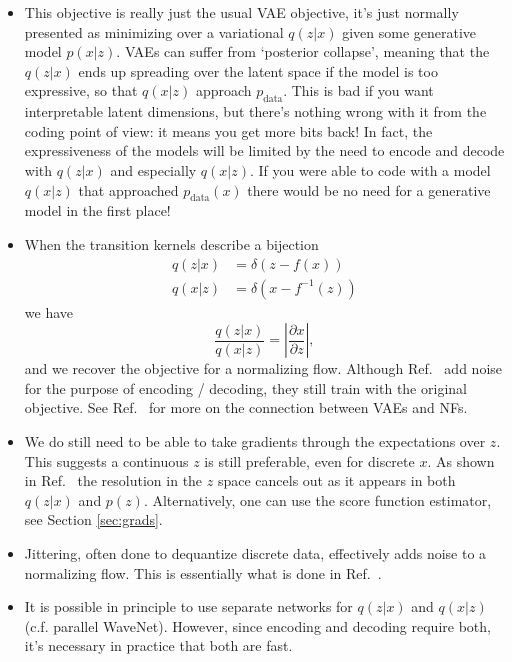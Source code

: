 \documentclass[preprint,notitlepage]{revtex4-1}
\begin{document}
\begin{itemize}

\item This objective is really just the usual VAE objective, it's just normally presented as minimizing over a variational $q(z|x)$ given some generative model $p(x|z)$. VAEs can suffer from `posterior collapse', meaning that the $q(z|x)$ ends up spreading over the latent space if the model is too expressive, so that $q(x|z)$ approach $p_\text{data}$. This is bad if you want interpretable latent dimensions, but there's nothing wrong with it from the coding point of view: it means you get more bits back! In fact, the expressiveness of the models will be limited by the need to encode and decode with $q(z|x)$ and especially $q(x|z)$. If you were able to code with a model $q(x|z)$ that approached $p_\text{data}(x)$ there would be no need for a generative model in the first place!

\item When the transition kernels describe a bijection
%
\begin{align}
  q(z|x) &= \delta(z-f(x))\\
  q(x|z) &= \delta(x-f^{-1}(z))
\end{align}
%
we have
%
\begin{equation}
  \frac{q(z|x)}{q(x|z)}=\left|\frac{\partial x}{\partial z}\right|,
\end{equation}
%
and we recover the objective for a normalizing flow. Although Ref.~\cite{Ho:2019aa} add noise for the purpose of encoding / decoding, they still train with the original objective. See Ref.~\cite{Gritsenko:2019aa} for more on the connection between VAEs and NFs.

\item We do still need to be able to take gradients through the expectations over $z$. This suggests a continuous $z$ is still preferable, even for discrete $x$. As shown in Ref.~\cite{Townsend:2019aa} the resolution in the $z$ space cancels out as it appears in both $q(z|x)$ and $p(z)$. Alternatively, one can use the score function estimator, see Section \ref{sec:grads}.

\item Jittering, often done to dequantize discrete data, effectively adds noise to a normalizing flow. This is essentially what is done in Ref.~\cite{Ho:2019aa}.

\item It is possible in principle to use separate networks for $q(z|x)$ and  $q(x|z)$ (c.f. parallel WaveNet). However, since encoding and decoding require both, it's necessary in practice that both are fast.

\end{itemize}
\end{document}
